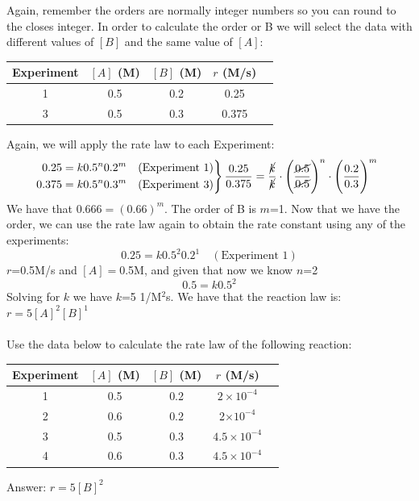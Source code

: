 \documentclass[main.tex]{subfiles}
\begin{document}
\begin{description}
\begin{example}
Again, remember the orders are normally integer numbers so you can round to the closes integer. 
In order to calculate the order or B we will select the data with different values of $[B]$ and the same value of $[A]$:
\begin{center}\begin{tabular}[t]{  c c  c c  c  }
\toprule
Experiment	&$[A]$ (M)&		$[B]$ (M)	&	$r$ (M/s)\\
\midrule
1&	0.5&	0.2&	0.25\\
3&	0.5&	0.3&	0.375\\
\bottomrule
\end{tabular}\end{center}
Again, we will apply the rate law to each Experiment:
\begin{align*}
&\
   \left.\begin{aligned}
   0.25=k0.5^n0.2^m\quad (\text{Experiment 1}) \\
     0.375=k0.5^n0.3^m\quad (\text{Experiment 3}) 
\end{aligned}
\right\}         \frac{0.25}{0.375}=\frac{\cancel{k}}{\cancel{k}}\cdot \Bigg(\frac{\cancel{0.5}}{\cancel{0.5}}\Bigg)^n \cdot \Bigg(\frac{ 0.2}{ 0.3}\Bigg)^m  
\end{align*}
We have that $0.666=(0.66)^m$.
The order of B is $m$=1. 
Now that we have the order, we can use the rate law again to obtain the rate constant using any of the experiments: 
\[0.25=k0.5^2 0.2^1\quad (\text{Experiment 1})\]
$r$=0.5M/s and $[A]=$0.5M, and given that now we know $n$=2
\[ 0.5=k0.5^2\]
Solving for $k$ we have $k$=5 1/M$^2$s. We have that the reaction law is: $r=5[A]^2[B]^1$
\\
\faDiamond\ \\
Use the data below to calculate the rate law of the following reaction: 
\begin{center}\begin{tabular}[t]{  c c  c c  c  }
\toprule
Experiment	&$[A]$ (M)&		$[B]$ (M)	&	$r$ (M/s)\\
\midrule
1&	0.5	&0.2	&$2\times 10^{-4}$\\
2&	0.6&	0.2&	2$\times 10^{-4}$\\
3&	0.5&	0.3&	$4.5\times 10^{-4}$\\
4&	0.6&	0.3&	$4.5\times 10^{-4}$\\
\bottomrule
\end{tabular}\end{center}
\flushright Answer:  $r=5[B]^2$
\end{example}%

\end{description}
\end{document}
